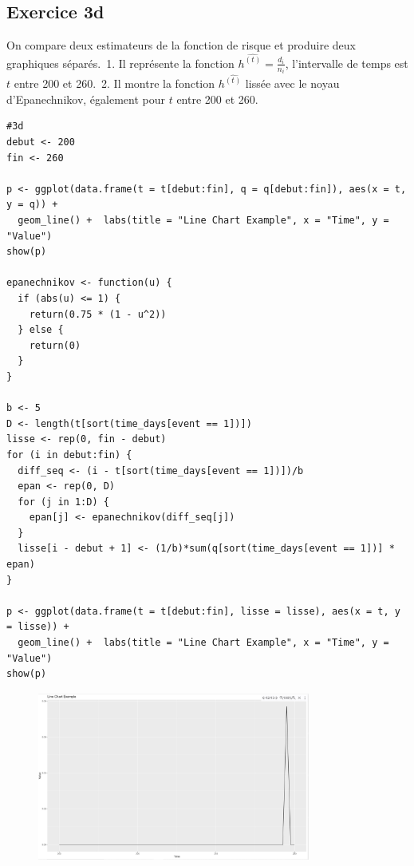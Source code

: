 \documentclass[../main.tex]{subfiles}
\begin{document}
\begin{CJK*}{UTF8}{gbsn}

\section*{Exercice 3d}
On compare deux estimateurs de la fonction de risque et produire deux graphiques séparés.\
1. Il représente la fonction $h^\hat{(t)} = \frac{d_i}{n_i}$, l'intervalle de temps est $t$ entre 200 et 260.\
2. Il montre la fonction $h^\hat{(t)}$ lissée avec le noyau d'Epanechnikov, également pour $t$ entre 200 et 260.



\begin{lstlisting}
#3d
debut <- 200
fin <- 260

p <- ggplot(data.frame(t = t[debut:fin], q = q[debut:fin]), aes(x = t, y = q)) +
  geom_line() +  labs(title = "Line Chart Example", x = "Time", y = "Value")
show(p)

epanechnikov <- function(u) {
  if (abs(u) <= 1) {
    return(0.75 * (1 - u^2))
  } else {
    return(0)
  }
}

b <- 5
D <- length(t[sort(time_days[event == 1])])
lisse <- rep(0, fin - debut)
for (i in debut:fin) {
  diff_seq <- (i - t[sort(time_days[event == 1])])/b
  epan <- rep(0, D)
  for (j in 1:D) {
    epan[j] <- epanechnikov(diff_seq[j])
  }
  lisse[i - debut + 1] <- (1/b)*sum(q[sort(time_days[event == 1])] * epan)
}

p <- ggplot(data.frame(t = t[debut:fin], lisse = lisse), aes(x = t, y = lisse)) +
  geom_line() +  labs(title = "Line Chart Example", x = "Time", y = "Value")
show(p)

\end{lstlisting}

\begin{figure}[H]
  \centering
  \includegraphics[width=0.8\textwidth]{3D2.JPG}
  \label{fig:mesh1}
\end{figure}


\end{CJK*}
\end{document}
